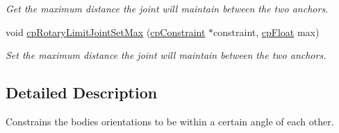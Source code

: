 \begin{DoxyCompactItemize}
\begin{DoxyCompactList}\small\item\em Get the maximum distance the joint will maintain between the two anchors. \end{DoxyCompactList}\item 
\hypertarget{group__cp_rotary_limit_joint_gaab19cc90af35a7a9f98339b4ad4ebee2}{}void \hyperlink{group__cp_rotary_limit_joint_gaab19cc90af35a7a9f98339b4ad4ebee2}{cp\+Rotary\+Limit\+Joint\+Set\+Max} (\hyperlink{structcp_constraint}{cp\+Constraint} $\ast$constraint, \hyperlink{group__basic_types_gac1ed65573e035bf892505768c852d8d3}{cp\+Float} max)\label{group__cp_rotary_limit_joint_gaab19cc90af35a7a9f98339b4ad4ebee2}

\begin{DoxyCompactList}\small\item\em Set the maximum distance the joint will maintain between the two anchors. \end{DoxyCompactList}\end{DoxyCompactItemize}


\subsection{Detailed Description}
Constrains the bodies\textquotesingle{} orientations to be within a certain angle of each other. 


